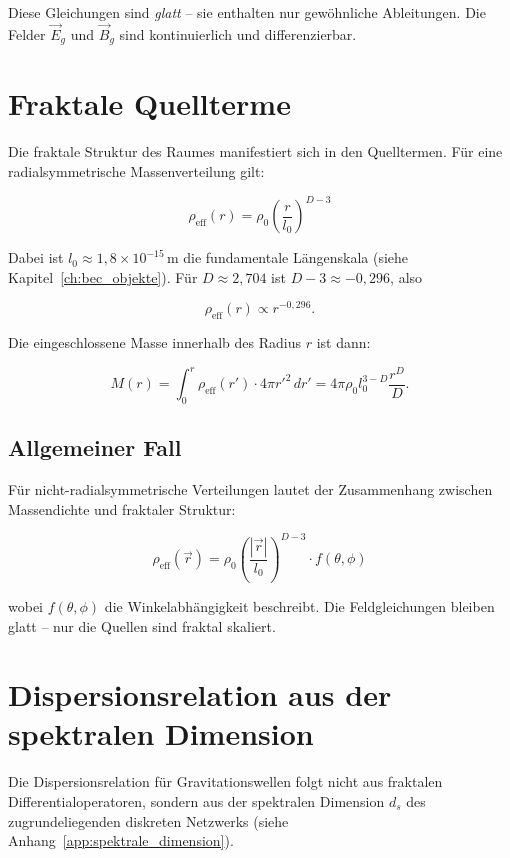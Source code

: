 Diese Gleichungen sind \emph{glatt} – sie enthalten nur gewöhnliche Ableitungen. Die Felder \( \vec{E}_g \) und \( \vec{B}_g \) sind kontinuierlich und differenzierbar.

\section{Fraktale Quellterme}
\label{sec:fm_quellen}

Die fraktale Struktur des Raumes manifestiert sich in den Quelltermen. Für eine radialsymmetrische Massenverteilung gilt:

\[
\rho_{\text{eff}}(r) = \rho_0 \left( \frac{r}{l_0} \right)^{D-3}
\]

Dabei ist \( l_0 \approx 1,8 \times 10^{-15} \, \text{m} \) die fundamentale Längenskala (siehe Kapitel~\ref{ch:bec_objekte}). Für \( D \approx 2,704 \) ist \( D-3 \approx -0,296 \), also

\[
\rho_{\text{eff}}(r) \propto r^{-0,296}.
\]

Die eingeschlossene Masse innerhalb des Radius \( r \) ist dann:

\[
M(r) = \int_0^r \rho_{\text{eff}}(r') \cdot 4\pi r'^2 \, dr' = 4\pi \rho_0 l_0^{3-D} \frac{r^D}{D}.
\]

\subsection{Allgemeiner Fall}
\label{sub:fm_allgemein}

Für nicht-radialsymmetrische Verteilungen lautet der Zusammenhang zwischen Massendichte und fraktaler Struktur:

\[
\rho_{\text{eff}}(\vec{r}) = \rho_0 \left( \frac{|\vec{r}|}{l_0} \right)^{D-3} \cdot f(\theta, \phi)
\]

wobei \( f(\theta, \phi) \) die Winkelabhängigkeit beschreibt. Die Feldgleichungen bleiben glatt – nur die Quellen sind fraktal skaliert.

\section{Dispersionsrelation aus der spektralen Dimension}
\label{sec:fm_dispersion}

Die Dispersionsrelation für Gravitationswellen folgt nicht aus fraktalen Differentialoperatoren, sondern aus der spektralen Dimension \( d_s \) des zugrundeliegenden diskreten Netzwerks (siehe Anhang~\ref{app:spektrale_dimension}).


